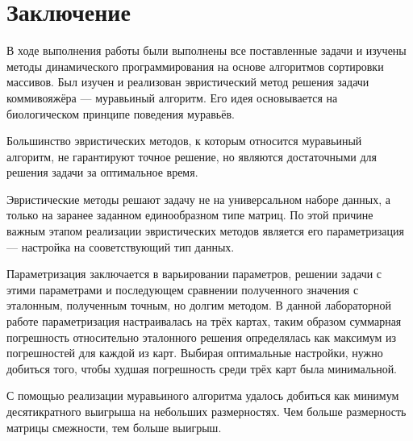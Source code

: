 \chapter*{Заключение}

В ходе выполнения работы были выполнены все поставленные задачи и изучены методы динамического программирования на основе алгоритмов сортировки массивов. Был изучен и реализован эвристи­ческий метод решения задачи коммивояжёра --- муравьиный алгоритм. Его идея основывается на биологическом принципе поведения муравьёв.

Большинство эвристических методов, к которым относится мура­вьиный алгоритм, не гарантируют точное решение, но являются доста­точными для решения задачи за оптимальное время.

Эвристические методы решают задачу не на универсальном наборе данных, а только на заранее заданном единообразном типе матриц. По этой причине важным этапом реализации эвристических методов является его параметризация --- настройка на сооветствующий тип данных.

Параметризация заключается в варьировании параметров, реше­нии задачи с этими параметрами и последующем сравнении получен­ного значения с эталонным, полученным точным, но долгим методом. В данной лабораторной работе параметризация настраивалась на трёх картах, таким образом суммарная погрешность относительно эталонного решения определялась как максимум из погрешностей для каждой из карт. Выбирая оптимальные настройки, нужно добиться того, чтобы худшая погрешность среди трёх карт была минимальной.

С помощью реализации муравьиного алгоритма удалось добиться как минимум десятикратного выигрыша на небольших размерностях. Чем больше размерность матрицы смежности, тем больше выигрыш.



